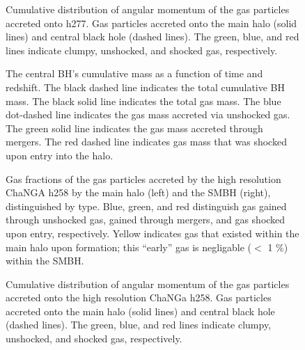 \documentclass[12pt,headA,chapB]{fiskthesis}
\begin{document}
\begin{figure}
\centerline{}
\caption[GASOLINE h258 Cumulative Angular Momentum Distribution]{ Cumulative distribution of angular momentum of the gas particles accreted onto h277.  Gas particles accreted onto the main halo (solid lines) and central black hole (dashed lines). The green, blue, and red lines indicate clumpy, unshocked, and shocked gas, respectively.}
\label{h277angmom} 
\end{figure}

\begin{figure}
\centerline{}
\caption[ChaNGa h258 SMBH Cumulative Mass]{The central BH’s cumulative mass as a function of time and redshift. The black dashed line indicates the total cumulative BH mass. The black solid line indicates the total gas mass. The blue dot-dashed line indicates the gas mass accreted via unshocked gas. The green solid line indicates the gas mass accreted through mergers. The red dashed line indicates gas mass that was shocked upon entry into the halo.}
\label{hrh258allmassgas} 
\end{figure}

\begin{figure}
\centerline{}
\caption[ChaNGa h258 Galaxy and SMBH Gas Fractions at z=0]{Gas fractions of the gas particles accreted by the high resolution ChaNGA h258 by the main halo (left) and the SMBH (right), distinguished by type. Blue, green, and red distinguish gas gained through unshocked gas, gained through mergers, and gas shocked upon entry, respectively. Yellow indicates gas that existed within the main halo upon formation; this ``early'' gas is negligable ($<$ 1 \%) within the SMBH.}
\label{hrh258stackfrac} 
\end{figure}

\begin{figure}
\centerline{}
\caption[ChaNGa h258 Cumulative Angular Momentum Distribution]{ Cumulative distribution of angular momentum of the gas particles accreted onto the high resolution ChaNGa h258.  Gas particles accreted onto the main halo (solid lines) and central black hole (dashed lines). The green, blue, and red lines indicate clumpy, unshocked, and shocked gas, respectively.}
\label{hrh258angmom} 
\end{figure}
\end{document}
